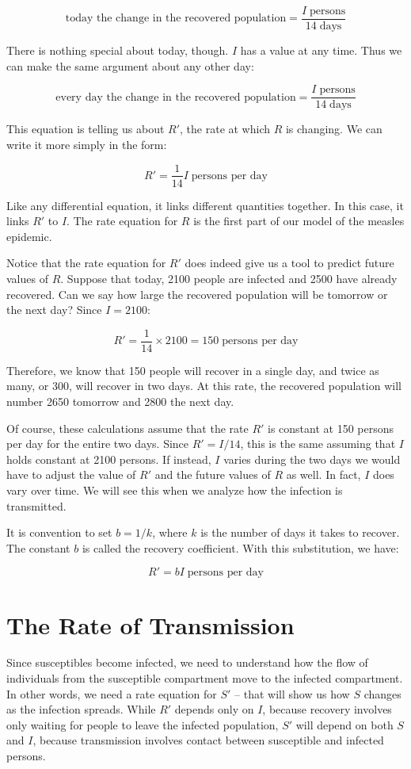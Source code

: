 \documentclass
[justified,nohyper]
{tufte-handout}
\begin{document}
\[
    \text{today the change in the recovered population} = 
    \dfrac{I\;\text{persons}}{14\;\text{days}}
\]

There is nothing special about today, though. $I$ has a value at any time. Thus 
we can make the same argument about any other day:

\[
    \text{every day the change in the recovered population} = 
    \dfrac{I\;\text{persons}}{14\;\text{days}}
\]

This equation is telling us about $R'$, the rate at which $R$ is changing. We can write it more simply in the form:

\[
    R' = \dfrac{1}{14}I \; \text{persons per day}
\]

Like any differential 
equation, it links different quantities together. In this case, it links $R'$ to 
$I$. The rate equation for $R$ is the first part of our model of the measles 
epidemic.

Notice that the rate equation for $R'$ does indeed give us a tool to predict 
future values of $R$. Suppose that today, 2100 people are infected and 2500 have 
already recovered. Can we say how large the recovered population will be tomorrow 
or the next day? Since $I=2100$:

\[
    R' = \dfrac{1}{14} \times 2100 = 150\;\text{persons per day}
\]

Therefore, we know that 150 people will recover in a single day, and twice as 
many, or 300, will recover in two days. At this rate, the recovered population 
will number 2650 tomorrow and 2800 the next day.

Of course, these calculations assume that the rate $R'$ is constant at 150 
persons per day for the entire two days. Since $R'=I/14$, this is the same 
assuming that $I$ holds constant at 2100 persons. If instead, $I$ varies during 
the two days we would have to adjust the value of $R'$ and the future values of 
$R$ as well. In fact, $I$ does vary over time. We will see this when we analyze 
how the infection is transmitted.

It is convention to set $b=1/k$, where $k$ is the number of days it takes to 
recover. The constant $b$ is called the recovery coefficient. With this 
substitution, we have:

\[
    R' = bI\;\text{persons per day}
\]

\section{The Rate of Transmission}
Since susceptibles become infected, we need to understand how the flow of 
individuals from the susceptible compartment move to the infected compartment. In 
other words, we need a rate equation for $S'$ -- that will show us how $S$ 
changes as the infection spreads. While $R'$ depends only on $I$, because 
recovery involves only waiting for people to leave the infected population, $S'$ 
will depend on both $S$ and $I$, because transmission involves contact between 
susceptible and infected persons.
\end{document}
